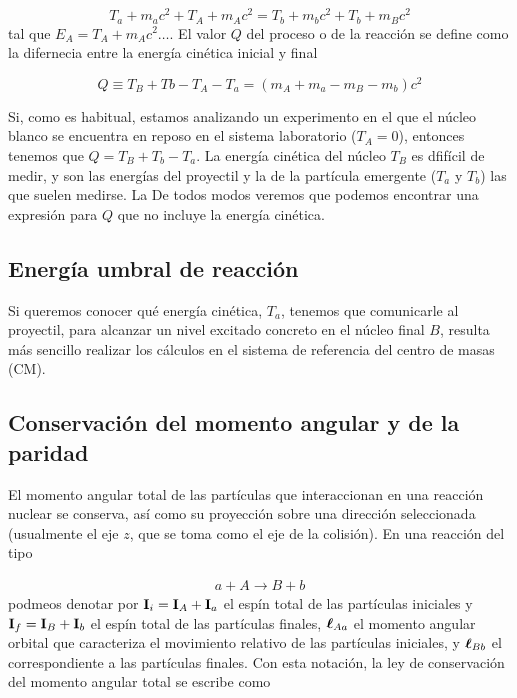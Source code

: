\begin{equation}
    T_a + m_a c^2 +T_A+m_A c^2 = T_b +m_bc^2 + T_b + m_Bc^2
\end{equation}
tal que $E_A = T_A + m_Ac^2\ldots$. El valor $Q$ del proceso o de la reacción se define como la difernecia entre la energía cinética inicial y final 

\begin{equation}
    Q \equiv T_B + Tb - T_A - T_a = (m_A + m_a - m_B - m_b) c^2
\end{equation}

Si, como es habitual, estamos analizando un experimento en el que el núcleo blanco se encuentra en reposo en el sistema laboratorio ($T_A=0$), entonces tenemos que $Q = T_B + T_b - T_a$. La energía cinética del núcleo $T_B$ es dfifícil de medir, y son las energías del proyectil y la de la partícula emergente ($T_a$ y $T_b$) las que suelen medirse. La De todos modos veremos que podemos encontrar una expresión para $Q$ que no incluye la energía cinética.



\subsection{Energía umbral de reacción}

Si queremos conocer qué energía cinética, $T_a$, tenemos que comunicarle al proyectil, para alcanzar un nivel excitado concreto en el núcleo final $B$, resulta más sencillo realizar los cálculos en el sistema de referencia del centro de masas (CM).  

\subsection{Conservación del momento angular y de la paridad}

El momento angular total de las partículas que interaccionan en una reacción nuclear se conserva, así como su proyección sobre una dirección seleccionada (usualmente el eje $z$, que se toma como el eje de la colisión). En una reacción del tipo 

\begin{eqnarray}
    a + A \longrightarrow B + b
\end{eqnarray}
podmeos denotar por $\mathbf{I}_i = \mathbf{I}_A + \mathbf{I}_a$ el espín total de las partículas iniciales y $\mathbf{I}_f=\mathbf{I}_B + \mathbf{I}_b$ el espín total de las partículas finales, $\boldsymbol{\ell}_{Aa}$ el momento angular orbital que caracteriza el movimiento relativo de las partículas iniciales, y $\boldsymbol{\ell}_{Bb}$ el correspondiente a las partículas finales. Con esta notación, la ley de conservación del momento angular total se escribe como 

